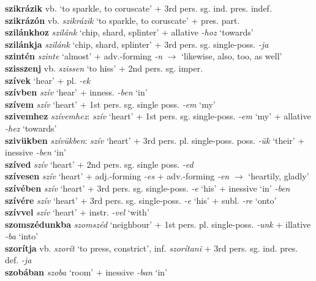 \documentclass[11pt]{article}
\begin{document}
\textbf{szikrázik} vb. `to sparkle, to coruscate' + 3rd
pers. sg. ind. pres. indef. \\
\textbf{szikrázón} vb. \emph{szikrázik} `to sparkle, to coruscate' +
pres. part. \\
\textbf{szilánkhoz} \emph{szilánk} `chip, shard, splinter' +
allative \emph{-hoz} `towards' \\
\textbf{szilánkja} \emph{szilánk} `chip, shard, splinter' + 3rd
    pers. sg. single\hyp{}poss. \emph{-ja} \\
\textbf{szintén} \emph{szinte} `almost' +
adv.\hyp{}forming \emph{-n} $\rightarrow$ `likewise, also, too, as
well' \\
\textbf{szisszenj} vb. \emph{szissen} `to hiss' + 2nd
pers. sg. imper. \\
\textbf{szívek} `hear' + pl. \emph{-ek} \\
\textbf{szívben} \emph{szív} `hear' + inness. \emph{-ben} `in' \\
\textbf{szívem} \emph{szív} `heart' + 1st pers. sg. single
poss. \emph{-em} `my' \\
\textbf{szivemhez} \emph{szívemhez}: \emph{szív} `heart' + 1st
pers. sg. single\hyp{}poss. \emph{-em} `my' + allative \emph{-hez}
`towards' \\
\textbf{szivükben} \emph{szívükben}: \emph{szív} `heart' + 3rd
pers. pl. single\hyp{}poss. poss. \emph{-ük} `their' + inessive \emph{-ben} `in' \\
\textbf{szíved} \emph{szív} `heart' + 2nd pers. sg. single
poss. \emph{-ed} \\
\textbf{szívesen} \emph{szív} `heart' + adj.\hyp{}forming \emph{-es} +
adv.\hyp{}forming \emph{-en} $\rightarrow$ `heartily, gladly' \\
\textbf{szívében} \emph{szív} `heart' + 3rd
pers. sg. single\hyp{}poss. \emph{-e} `his' +
inessive `in' \emph{-ben} \\
\textbf{szívére} \emph{szív} `heart' + 3rd
pers. sg. single\hyp{}poss. \emph{-e} `his' + subl. \emph{-re} `onto' \\
\textbf{szívvel} \emph{szív} `heart' + instr. \emph{-vel}
  `with' \\
\textbf{szomszédunkba} \emph{szomszéd} `neighbour' + 1st
pers. pl. single\hyp{}poss. \emph{-unk} + illative \emph{-ba} `into' \\
\textbf{szorítja} vb. \emph{szorít} `to press, constrict',
inf. \emph{szorítani} + 3rd pers. sg. ind. pres. def. \emph{-ja} \\
\textbf{szobában} \emph{szoba} `room' + inessive \emph{-ban} `in' \\
\end{document}
